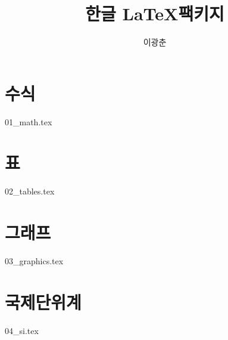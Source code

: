 \documentclass{article}
\begin{document}
	\title{한글 \LaTeX 팩키지}
	
	\author{이광춘}
	\maketitle
	
	\section{수식}
		{01_math.tex}
	\section{표}
		{02_tables.tex}
	\section{그래프}
		{03_graphics.tex}
	\section{국제단위계}
		{04_si.tex}

	\listoftables
	\listoffigures
	
\end{document}
